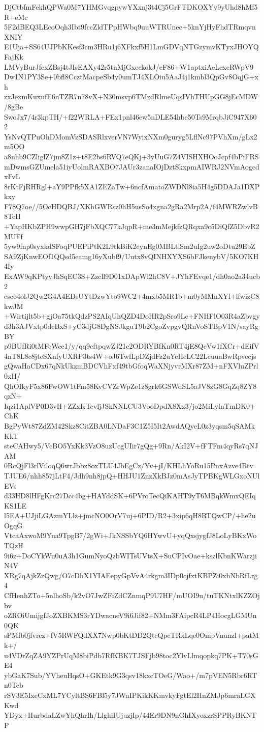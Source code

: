 DjCtbfmFekhQPWa0M7YHMGvqgpywYXxnj3t4Cj5GrFTDKOXYy9yUhd8hMf5R+eMc
5F2dBEQ3LEcoOqh3Ibt9fccZldTPpHWbq9uuWTRUnec+5knYjHyFhdTRmqvnXNIY
E1Uja+SS64UJPbKKesf3cm3HRu1j6XFkxf5H1LmGDVqNTGzymvKTyxJHOYQFajKk
LMVyBurJfcxZBsj4tJIsEAXy42r5tnMjGxeckokJ/cF86+W1aptxiAeLcxeRWpV9
Dw1N1PY3Se+0bfl8CcztMacpeSb4y0umTJ4XLOiu5AaJ4j1kmbl3QpGv8OqjG+xh
zxJexmKuxufE6nTZR7n78vX+N30msvp6TMzdRlmeUqsIVhTHUpGG8jEcMDW/8gBe
SwoJx7/4r3kpTH/+f22WRLA+FEx1pnl46ew5nDLE54hbe50Ts9MrqbJiC947X602
YsNvQTPuOhDMomVzSDASRlxverVN7WyixNXm0guryg5LflNc97PVhXm/gLx2m5OO
a8nhb9CZliglZ7jm8Z1z+t8E2bs6RVQ7eQKj+3yUuG7Z4VISHXHOoJcpf4bPiFRS
mDwmsGZUmela51iyUolmRAXBO7JAUr3zanaIOjDztSkxpmAIWRJ2NVmAogcdxFvL
8rKtFjRHRgl+aY9PPfk5XA1ZEZaTw+6ncfAmatoZWDNl8ia5H4g5DDAJa1DXPkxy
F78Q7oe//5OcHDQBJ/XKhGWRsz0hH5usSo4xgna2gRa2Mrp2A/f4MWRZwlvB8TeH
+YapHKbZPH9wwpGH7jFbXQC77kJqpR+me3mMejkfzQRqxa9c5DiQfZ5DbvR2MUFf
5yw9fnp0syxkdSFoqPUEPiPtK2L9tkBiK2eynEg0MBLtlSm2uIg2uw2oDtu29EbZ
SA9ZjKnwEOf1QQsd5eamg16yXubf9/Uutx8vQINHXYXS6bFJkenybV/5KO7KH4Iy
ExAW9qKPtyyJhSqEC3S+Zzcll9D01xDApWl2hC8V+JYhFEvqe1/dh0ao2a34ucb2
esco4olJ2Qw2G4A4EDsUYtDzwYto9WC2+4mxb5MR1b+m0yMMnXYl+lfwizC8kwJM
+Wirtijlt5b+gjOa75tkQdzPS2AIqUhQZD4DoHR2pSro9Lc+FNHFlO03R4aZbvgy
d3h3AJVxtp0deBxS+yC3djG8DgNSJkguT9b2CgoZvpgvQRnVoSTBpV1N/sayRgBY
p9BUfRi0tMFcWce1/y/qq9cftpqwZJ21c2ODRYBfKn0RT4jE8QcVw1fXCr+dEifV
4nT8L8c8jtcSXnfyUXRP3ts4W+oJ6TwfLpDZjdFz2uYeHeLC22LcuuaBwRpvecjs
gQwaHaCDx67qNkUkzmBDCVhFxf49tbGfoqWaXNjyvrMXr87ZM+nFXVluZPrl0xH/
QhOIkyF5x86FwOW1tFm58KvCVZrWpZe1z8grk6GSWdSL5aJV8zG8GqZq8ZY8qzN+
Iqzi1AplVP0D3vH+ZZxKTcvljJSkNNLCU3VooDpdX8Xx3/jo2MiLylnTmDK0+ChK
BgPyWt87ZdZM42Skz8CitZBA0LNDaF3C1Z5I5It2AwdAQyeL0z3yqsm5qSAMkKkT
steCAHwy5/VcBO5YxKk3VzO8uzUcgUIir7gQg+9Rn/AkI2V+fFTFm4qyRs7qNJAM
0RcQjFl3rlViloqQ6wrJbbx8oxTLU4JbEgCz/Yv+jI/KHLhYoRu15PnxAzve4Btv
TJUE6/nhh857jLtF4/Jdh9nh8jpQ+HHJU1ZnzXkBJz0mAsJyTPBKgWLGxoNUlEVs
d33HD8lHFgKrc27Dcc4bg+HAYddSK+6PVroTecQiKAHT9yT6MBqkWmxQEIqKS1LE
l5EA+UJjiLGAzmYLlz+jmcNO0OrV7uj+6PID/R2+3xip6qH8RTQwCP/+he2uOgqG
VtcaAxwoM9Yua9TpgB7/2gWi+JkNSSbYQ6HYwvU+yqQxsjygfJ8LoLyBKxWoTQzH
9i6z+DoCYkWu0uA3h1GumNyoQzbWITsUVtsX+SuCPIvOae+kszlKbnKWarzjiN4V
XRg7qAjkZzQwg/O7cDhX1YIAEepyGpVvA4rkgm3IDp0cjfxtKBPZi0xhNbRfLrg4
CfHenhZTo+5nlhoSb/k2vO7JwZFiZdCZnmqP9U7HF/mUOI9u/tuTKNtxlKZZOjbv
oZROiUmijgfJoZXBKMS3rYDwacneV9i6Jif82+NMm3FAipcR4LP4HocgLGMUn0QK
sPMfb0jfvrez+fV5RWFQdXX7Nwp0bKtDD2QtcQpeTRxLqe0OmpVnunzl+patMk+/
u4VDrZqZA9YZPrUqM8biPdb7RfKBK7TJSFjb98toc2YlvLlmqopkq7PK+T70sGE4
ybGaK7Sub/YVheuHqsO+GKEtk9G3qsv18kxcTOeG/Wao+/m7pVEN5Rbr6RTn0Tcb
rSV3E5IxeCxML7YCyltBS6FBl5y7JWnIPKikKKmvkyFgtEl2HnZMJp6mraLGXKwd
YDyx+HurbdaLZwYhQhrIh/LlghiIUjuzjIp/44Er9DN9nGhIXyoxzrSPPRyBKNTP

